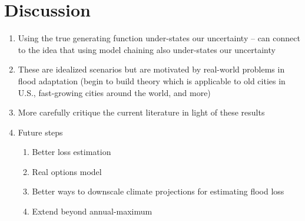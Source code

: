 \section{Discussion}

\begin{enumerate}
  \item Using the true generating function under-states our uncertainty -- can connect to the idea that using model chaining also under-states our uncertainty
  \item These are idealized scenarios but are motivated by real-world problems in flood adaptation (begin to build theory which is applicable to old cities in U.S., fast-growing cities around the world, and more)
  \item More carefully critique the current literature in light of these results
  \item Future steps
  \begin{enumerate}
    \item Better loss estimation
    \item Real options model
    \item Better ways to downscale climate projections for estimating flood loss
    \item Extend beyond annual-maximum
  \end{enumerate}
\end{enumerate}
